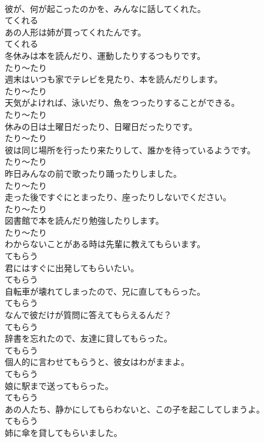\documentclass[8pt]{extreport}
\begin{document}
\begin{CJK}{UTF8}{min}
\\	彼が、何が起こったのかを、みんなに話してくれた。	
\\	てくれる
\\	あの人形は姉が買ってくれたんです。	
\\	てくれる
\\	冬休みは本を読んだり、運動したりするつもりです。	
\\	たり～たり
\\	週末はいつも家でテレビを見たり、本を読んだりします。	
\\	たり～たり
\\	天気がよければ、泳いだり、魚をつったりすることができる。	
\\	たり～たり
\\	休みの日は土曜日だったり、日曜日だったりです。	
\\	たり～たり
\\	彼は同じ場所を行ったり来たりして、誰かを待っているようです。	
\\	たり～たり
\\	昨日みんなの前で歌ったり踊ったりしました。	
\\	たり～たり
\\	走った後ですぐにとまったり、座ったりしないでください。	
\\	たり～たり
\\	図書館で本を読んだり勉強したりします。	
\\	たり～たり
\\	わからないことがある時は先輩に教えてもらいます。	
\\	てもらう
\\	君にはすぐに出発してもらいたい。	
\\	てもらう
\\	自転車が壊れてしまったので、兄に直してもらった。	
\\	てもらう
\\	なんで彼だけが質問に答えてもらえるんだ？	
\\	てもらう
\\	辞書を忘れたので、友達に貸してもらった。	
\\	てもらう
\\	個人的に言わせてもらうと、彼女はわがままよ。	
\\	てもらう
\\	娘に駅まで送ってもらった。	
\\	てもらう
\\	あの人たち、静かにしてもらわないと、この子を起こしてしまうよ。	
\\	てもらう
\\	姉に傘を貸してもらいました。	

\end{CJK}
\end{document}
